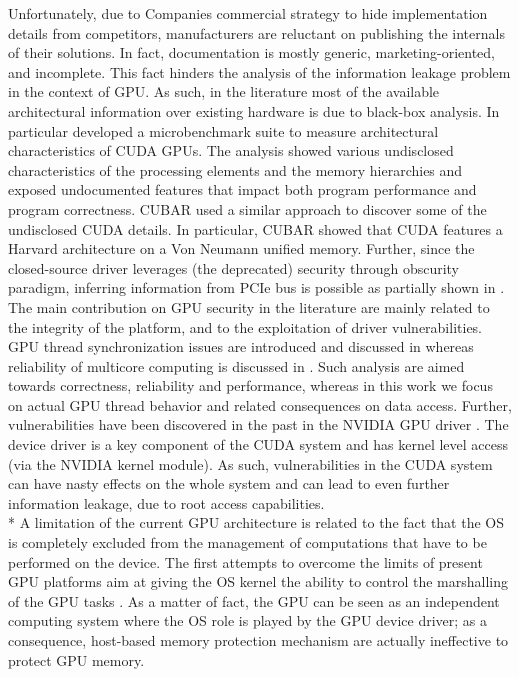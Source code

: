 \documentclass[11pt,onecolumn,letterpaper]{IEEEtran}
\begin{document}
Unfortunately, due to Companies commercial strategy to hide implementation details from competitors, 
manufacturers are reluctant on publishing the internals of their solutions. 
In fact, documentation is mostly generic, marketing-oriented, and incomplete. 
This fact hinders the analysis of the information leakage problem in the context of GPU.
As such, in the literature most of the available architectural information over existing hardware is due to black-box analysis.
In particular \cite{demystifying} developed a microbenchmark suite to measure architectural characteristics of CUDA GPUs.
The analysis showed various undisclosed characteristics of the processing elements and the memory hierarchies
and exposed undocumented features that impact both program performance and program correctness.
CUBAR \cite{cubar} used a similar approach to discover some of the undisclosed CUDA details.
In particular, CUBAR showed that CUDA features a Harvard architecture on a Von Neumann unified memory.
Further, since the closed-source driver leverages (the deprecated) security through obscurity paradigm,
inferring information from PCIe bus \cite{cudadevguide} is possible as partially shown in \cite{gdev}.\\
The main contribution on GPU security in the literature are mainly related to the integrity of the platform, 
and to the exploitation of driver vulnerabilities.
GPU thread synchronization issues are introduced and discussed in \cite{5537722}
whereas reliability of multicore computing is discussed in \cite{Shye:2009:PSA:1550410.1550669}.
Such analysis are aimed towards correctness, reliability and performance, 
whereas in this work we focus on actual GPU thread  behavior and related consequences on data access.
Further, vulnerabilities have been discovered in the past in the NVIDIA GPU driver \cite{nvidiavuln1, nvidiavuln2}.
The device driver is a key component of the CUDA system and has kernel level access (via the NVIDIA kernel module).
As such, vulnerabilities in the CUDA system can have nasty effects on the whole system 
and can lead to even further information leakage, due to root access capabilities.\\*
A limitation of the current GPU architecture is related to the fact that the OS is
completely excluded from the management of computations that have to be performed on the device. 
The first attempts to overcome the limits of present GPU platforms aim at giving the OS kernel
the ability to control the marshalling of the GPU tasks \cite{timegraph,ptask}.
As a matter of fact, the GPU can be seen as an independent computing system where the OS role is played by the GPU device driver;
as a consequence, host-based memory protection mechanism are actually ineffective to protect GPU memory.
\end{document}
